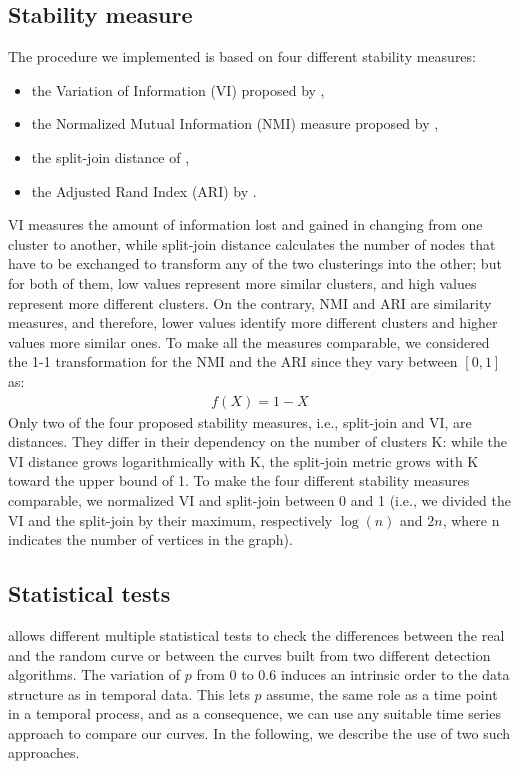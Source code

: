 \subsection{Stability measure}	
The procedure we implemented is based on four different stability measures:
\begin{itemize}
\item	 the Variation of Information (VI) proposed by \cite{Meila:2007}, 
\item the Normalized Mutual Information (NMI) measure proposed by \cite{Danon_et_al:2005},
\item the split-join distance of \cite{vanDongen:2000},
\item the Adjusted Rand Index (ARI) by \cite{HubertArabie:1985}.
\end{itemize}
VI measures the amount of information lost and gained in changing from one cluster to another, while split-join distance calculates the number of nodes that have to be exchanged to transform any of the two clusterings into the other; but for both of them, low values represent more similar clusters, and high values represent more different clusters. On the contrary, NMI and ARI are similarity measures, and therefore, lower values identify more different clusters and higher values more similar ones. To make all the measures comparable, we considered the 1-1 transformation for the NMI and the ARI since they vary between $[0,1]$ as: 
\begin{align}
f\left(X\right)=1-X  
\end{align}
Only two of the four proposed stability measures, i.e., split-join and VI, are distances. They differ in their dependency on the number of clusters K: while the VI distance grows logarithmically with K, the split-join metric grows with K toward the upper bound of 1. To make the four different stability measures comparable, we normalized VI and split-join between 0 and 1 (i.e., we divided the VI and the split-join by their maximum, respectively $\log\left(n\right)$ and $2n$, where n indicates the number of vertices in the graph).
	
\subsection{Statistical tests}
 allows different multiple statistical tests to check the differences between the real and the random curve or between the curves built from two different detection algorithms. 
The variation of $p$ from $0$ to $0.6$ induces an intrinsic order to the data structure as in temporal data. This lets $p$ assume, the same role as a time point in a temporal process, and as a consequence, we can use any suitable time series approach to compare our curves. In the following, we describe the use of two such approaches.

